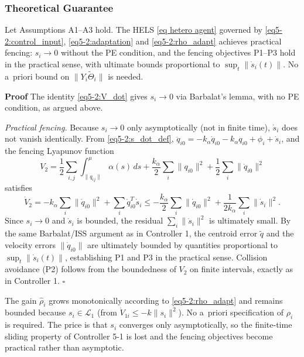 \subsubsection{Theoretical Guarantee}

\begin{theorem}
	Let Assumptions A1--A3 hold. The HELS \eqref{eq hetero agent} governed by
	\eqref{eq5-2:control_input}, \eqref{eq5-2:adaptation} and \eqref{eq5-2:rho_adapt}
	achieves practical fencing: $s_i \to 0$ without the PE condition, and the fencing
	objectives P1--P3 hold in the practical sense, with ultimate bounds proportional to
	$\sup_t\|\dot{s}_i(t)\|$. No a~priori bound on $\|Y_i\tilde{\Theta}_i\|$ is needed.
\end{theorem}

\noindent\textbf{Proof}
The identity \eqref{eq5-2:V_dot} gives $s_i \to 0$ via Barbalat's lemma, with no PE
condition, as argued above.

\noindent\textit{Practical fencing.}
Because $s_i \to 0$ only asymptotically (not in finite time), $\dot{s}_i$ does not vanish
identically. From \eqref{eq5-2:s_dot_def},
$\ddot{q}_{i0} = -k_\alpha\dot{q}_{i0} - k_\alpha q_{i0} + \phi_i + \dot{s}_i$, and the
fencing Lyapunov function
\begin{equation*}
	V_2 = \frac12\sum_{i,j}\int_{\|q_{ij}\|}^{\mu}\alpha(s)\,ds
		+ \frac{k_\alpha}{2}\sum_i\|q_{i0}\|^2
		+ \frac12\sum_i\|\dot{q}_{i0}\|^2
\end{equation*}
satisfies
\begin{equation*}
	\dot{V}_2 = -k_\alpha\sum_i\|\dot{q}_{i0}\|^2 + \sum_i\dot{q}_{i0}^T\dot{s}_i
	\le -\frac{k_\alpha}{2}\sum_i\|\dot{q}_{i0}\|^2
		+ \frac{1}{2k_\alpha}\sum_i\|\dot{s}_i\|^2.
\end{equation*}
Since $s_i \to 0$ and $\dot{s}_i$ is bounded, the residual $\sum_i\|\dot{s}_i\|^2$ is
ultimately small. By the same Barbalat/ISS argument as in Controller 1, the centroid
error $\tilde{q}$ and the velocity errors $\|\dot{q}_{i0}\|$ are ultimately bounded by
quantities proportional to $\sup_t\|\dot{s}_i(t)\|$, establishing P1 and P3 in the
practical sense. Collision avoidance (P2) follows from the boundedness of $V_2$ on finite
intervals, exactly as in Controller 1.
\hfill$\square$

\begin{remark}
	The gain $\hat{\rho}_i$ grows monotonically according to \eqref{eq5-2:rho_adapt} and
	remains bounded because $s_i \in \mathcal{L}_1$ (from $\dot{V}_{1i} \le -k\|s_i\|^2$).
	No a~priori specification of $\rho_i$ is required. The price is that $s_i$ converges
	only asymptotically, so the finite-time sliding property of Controller 5-1 is lost
	and the fencing objectives become practical rather than asymptotic.
\end{remark}